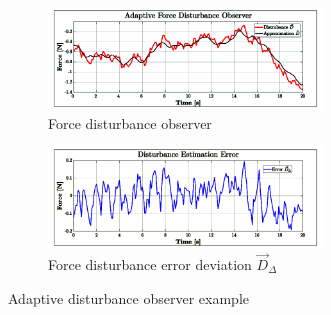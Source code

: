 \begin{figure}[htbp]
\centering
\begin{subfigure}{\textwidth}
\centering
\includegraphics[width=0.8\textwidth]{graphs/disturbance_D}
\vspace{-8pt}
\caption{Force disturbance observer}
\label{fig:disturbance_D}
\end{subfigure}
\begin{subfigure}{\textwidth}
\centering
\includegraphics[width=0.8\textwidth]{graphs/error_DR}
\vspace{-8pt}
\caption{Force disturbance error deviation $\vec{D}_\Delta$}
\label{fig:error_DR}
\end{subfigure}
\vspace{-6pt}
\caption{Adaptive disturbance observer example}
\label{fig:example_D}
\end{figure}

